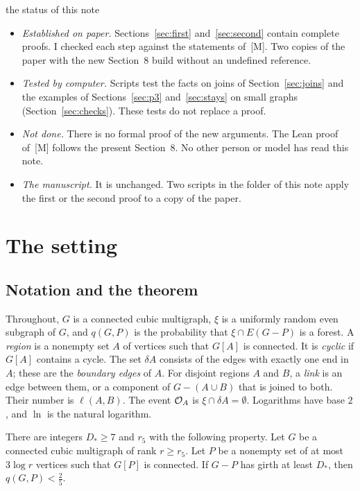\documentclass[11pt]{article}
\newcommand{\M}[1]{[M,~#1]}
\begin{document}
\begin{notation}{the status of this note}
\begin{itemize}[leftmargin=1.2em]
\item \emph{Established on paper.} Sections~\ref{sec:first} and~\ref{sec:second} contain complete
proofs. I checked each step against the statements of~[M]. Two copies of the paper with the new
Section~8 build without an undefined reference.
\item \emph{Tested by computer.} Scripts test the facts on joins of Section~\ref{sec:joins} and
the examples of Sections~\ref{sec:p3} and~\ref{sec:stays} on small graphs
(Section~\ref{sec:checks}). These tests do not replace a proof.
\item \emph{Not done.} There is no formal proof of the new arguments. The Lean proof of~[M]
follows the present Section~8. No other person or model has read this note.
\item \emph{The manuscript.} It is unchanged. Two scripts in the folder of this note apply the
first or the second proof to a copy of the paper.
\end{itemize}
\end{notation}

\contentsblock

\section{The setting}\label{sec:setting}

\subsection{Notation and the theorem}

Throughout, $G$ is a connected cubic multigraph, $\xi$ is a uniformly random even subgraph of
$G$, and $q(G,P)$ is the probability that $\xi\cap E(G-P)$ is a forest. A \emph{region} is a
nonempty set $A$ of vertices such that $G[A]$ is connected. It is \emph{cyclic} if $G[A]$ contains
a cycle. The set $\delta A$ consists of the edges with exactly one end in $A$; these are the
\emph{boundary edges} of $A$. For disjoint regions $A$ and $B$, a \emph{link} is an edge between
them, or a component of $G-(A\cup B)$ that is joined to both. Their number is $\ell(A,B)$. The
event $\mathcal{O}_A$ is $\xi\cap\delta A=\emptyset$. Logarithms have base $2$, and $\ln$ is the natural
logarithm.

\begin{theorem}[{\M{Theorem~8.1}}]\label{thm:half}
There are integers $D_*\ge7$ and $r_5$ with the following property. Let $G$ be a connected cubic
multigraph of rank $r\ge r_5$. Let $P$ be a nonempty set of at most $3\log r$ vertices such that
$G[P]$ is connected. If $G-P$ has girth at least $D_*$, then $q(G,P)<\frac25$.
\end{theorem}
\end{document}
